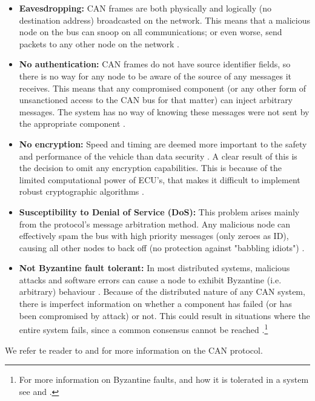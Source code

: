 \begin{itemize}
	\item \textbf{Eavesdropping:} CAN frames are both physically and logically (no destination address) broadcasted on the network. This means that a malicious node on the bus can snoop on all communications; or even worse, send packets to any other node on the network \cite{Kosher}. 
	
	\item \textbf{No authentication:} CAN frames do not have source identifier fields, so there is no way for any node to be aware of the source of any messages it receives. This means that any compromised component (or any other form of unsanctioned access to the CAN bus for that matter) can inject arbitrary messages. The system has no way of knowing these messages were not sent by the appropriate component \cite{Kosher,CANissues}.
	
	\item \textbf{No encryption:} Speed and timing are deemed more important to the safety and performance of the vehicle than data security \cite{Klinedinst05}. A clear result of this is the decision to omit any encryption capabilities. This is because of the limited  computational power of ECU's, that makes it difficult to implement robust cryptographic algorithms \cite{CANissues}.  
	
	\item \textbf{Susceptibility to Denial of Service (DoS):} This problem arises mainly from the protocol's message arbitration method. Any malicious node can effectively spam the bus with high priority messages (only zeroes as ID), causing all other nodes to back off (no protection against "babbling idiots") \cite{Kosher,Pike15}.
	
	\item \textbf{Not Byzantine fault tolerant:} In most distributed systems, malicious attacks and software errors can cause a node to exhibit Byzantine (i.e. arbitrary) behaviour \cite{Byzantine}. Because of the distributed nature of any CAN system, there is imperfect information on whether a component has failed (or has been compromised by attack) or not. This could result in situations where the entire system fails, since a common consensus cannot be reached \cite{wiki:ByzantineFault}.\footnote{For more information on Byzantine faults, and how it is tolerated in a system see \cite{Byzantine} and \cite{wiki:ByzantineFault}.}
	
\end{itemize}
We refer te reader to \cite{ISO11898-2} and \cite{ISO11898-3} for more information on the CAN protocol.

